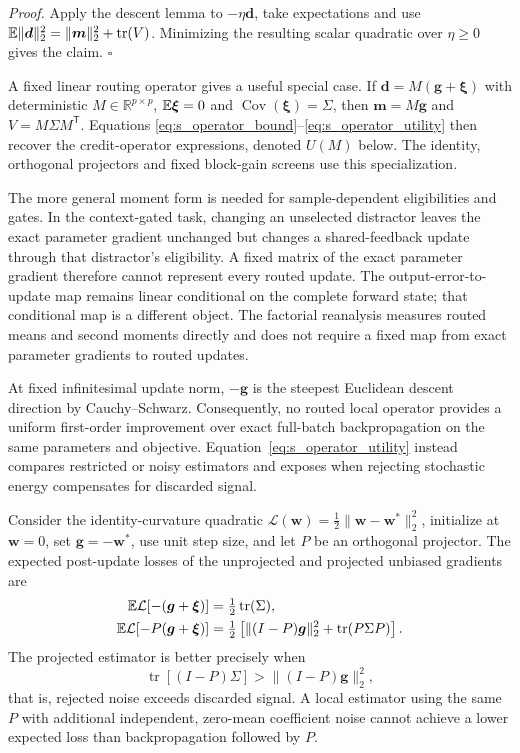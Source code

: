 \noindent\emph{Proof.}
Apply the descent lemma \citep{nesterov2004convex} to $-\eta\bm d$, take expectations and use
$\mathbb{E}\lVert\bm d\rVert_2^2=\lVert\bm m\rVert_2^2+\operatorname{tr}(V)$.
Minimizing the resulting scalar quadratic over $\eta\geq0$ gives the
claim. \hfill$\square$

A fixed linear routing operator gives a useful special case. If
$\bm d=M(\bm g+\bm\xi)$ with deterministic $M\in\mathbb R^{p\times p}$,
$\mathbb{E}\bm\xi=0$ and $\operatorname{Cov}(\bm\xi)=\Sigma$, then
$\bm m=M\bm g$ and $V=M\Sigma M^{\mathsf T}$. Equations
\ref{eq:s_operator_bound}--\ref{eq:s_operator_utility} then recover the
credit-operator expressions, denoted $U(M)$ below. The identity, orthogonal
projectors and fixed block-gain screens use this specialization.

The more general moment form is needed for sample-dependent eligibilities
and gates. In the context-gated task, changing an unselected distractor
leaves the exact parameter gradient unchanged but changes a shared-feedback
update through that distractor's eligibility. A fixed matrix of the exact
parameter gradient therefore cannot represent every routed update. The
output-error-to-update map remains linear conditional on the complete
forward state; that conditional map is a different object. The factorial
reanalysis measures routed means and second moments directly and does not
require a fixed map from exact parameter gradients to routed updates.

At fixed infinitesimal update norm, $-\bm g$ is the steepest Euclidean descent
direction by Cauchy--Schwarz. Consequently, no routed local operator provides a
uniform first-order improvement over exact full-batch backpropagation on the
same parameters and objective. Equation~\ref{eq:s_operator_utility} instead
compares restricted or noisy estimators and exposes when rejecting stochastic
energy compensates for discarded signal.

\begin{corollary}
Consider the identity-curvature quadratic
$\mathcal L(\bm w)=\frac12\lVert\bm w-\bm w^*\rVert_2^2$, initialize at
$\bm w=0$, set $\bm g=-\bm w^*$, use unit step size, and let $P$ be an
orthogonal projector. The expected post-update losses of the unprojected and
projected unbiased gradients are
\begin{align}
\mathbb{E}\mathcal L[-(\bm g+\bm\xi)]
&=\tfrac12\operatorname{tr}(\Sigma),\\
\mathbb{E}\mathcal L[-P(\bm g+\bm\xi)]
&=\tfrac12\left[
\lVert(I-P)\bm g\rVert_2^2+\operatorname{tr}(P\Sigma P)
\right].
\end{align}
The projected estimator is better precisely when
\begin{equation}
\operatorname{tr}[(I-P)\Sigma]
>\lVert(I-P)\bm g\rVert_2^2,
\label{eq:s_projection_crossover}
\end{equation}
that is, rejected noise exceeds discarded signal. A local estimator using the
same $P$ with additional independent, zero-mean coefficient noise cannot
achieve a lower expected loss than backpropagation followed by $P$.
\end{corollary}

